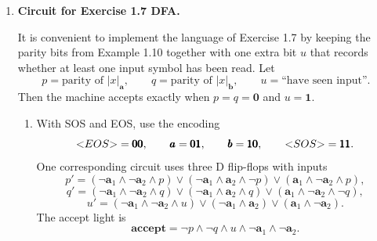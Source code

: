\documentclass[11pt,openany]{book}
\def\<{\text{\textless}}
\def\>{\text{\textgreater}}
\begin{document}
\begin{enumerate}[{1.}1.]
\begin{enumerate}
\item Without \<SOS\> and \<EOS\>, only one input bit is needed; let $x=\pmb{0}$ represent $\pmb{a}$ and $x=\pmb{1}$ represent $\pmb{b}$. The next state is just
\[
t_1'=t_1\oplus x.
\]
So the circuit is a single D flip-flop whose input is the exclusive-or of the current state bit and the input bit.

A corresponding circuit diagram for the version with \<SOS\> and \<EOS\> is:
\begin{center}
\end{center}
\end{enumerate}

\item \textbf{Circuit for Exercise 1.7 DFA.}

It is convenient to implement the language of Exercise 1.7 by keeping the parity bits from Example 1.10 together with one extra bit $u$ that records whether at least one input symbol has been read. Let
\[
p=\text{parity of }|x|_{\pmb{a}},\qquad q=\text{parity of }|x|_{\pmb{b}},\qquad u=\text{``have seen input''}.
\]
Then the machine accepts exactly when $p=q=\pmb{0}$ and $u=\pmb{1}$.

\begin{enumerate}
\item With \<SOS\> and \<EOS\>, use the encoding
\[
\<EOS\>=\pmb{00},\qquad \pmb{a}=\pmb{01},\qquad \pmb{b}=\pmb{10},\qquad \<SOS\>=\pmb{11}.
\]
One corresponding circuit uses three D flip-flops with inputs
\[
p'=(\neg \pmb{a}_1\wedge \neg \pmb{a}_2\wedge p)\vee
(\neg \pmb{a}_1\wedge \pmb{a}_2\wedge \neg p)\vee
(\pmb{a}_1\wedge \neg \pmb{a}_2\wedge p),
\]
\[
q'=(\neg \pmb{a}_1\wedge \neg \pmb{a}_2\wedge q)\vee
(\neg \pmb{a}_1\wedge \pmb{a}_2\wedge q)\vee
(\pmb{a}_1\wedge \neg \pmb{a}_2\wedge \neg q),
\]
\[
u'=(\neg \pmb{a}_1\wedge \neg \pmb{a}_2\wedge u)\vee
(\neg \pmb{a}_1\wedge \pmb{a}_2)\vee
(\pmb{a}_1\wedge \neg \pmb{a}_2).
\]
The accept light is
\[
\textbf{accept}=\neg p\wedge \neg q\wedge u\wedge \neg \pmb{a}_1\wedge \neg \pmb{a}_2.
\]


\end{enumerate}
\end{enumerate}
\end{document}

